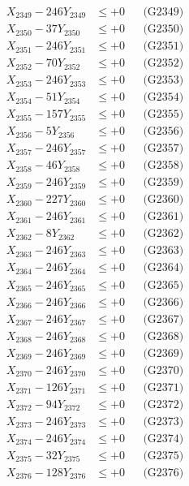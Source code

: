 \documentclass[a4paper,10pt]{article}
\begin{document}
{\begin{align}
X_{2349} - 246Y_{2349} &\leq +0 && \text{(G2349)} \\
X_{2350} - 37Y_{2350} &\leq +0 && \text{(G2350)} \\
\allowbreak
X_{2351} - 246Y_{2351} &\leq +0 && \text{(G2351)} \\
X_{2352} - 70Y_{2352} &\leq +0 && \text{(G2352)} \\
X_{2353} - 246Y_{2353} &\leq +0 && \text{(G2353)} \\
X_{2354} - 51Y_{2354} &\leq +0 && \text{(G2354)} \\
X_{2355} - 157Y_{2355} &\leq +0 && \text{(G2355)} \\
X_{2356} - 5Y_{2356} &\leq +0 && \text{(G2356)} \\
X_{2357} - 246Y_{2357} &\leq +0 && \text{(G2357)} \\
X_{2358} - 46Y_{2358} &\leq +0 && \text{(G2358)} \\
X_{2359} - 246Y_{2359} &\leq +0 && \text{(G2359)} \\
X_{2360} - 227Y_{2360} &\leq +0 && \text{(G2360)} \\
\allowbreak
X_{2361} - 246Y_{2361} &\leq +0 && \text{(G2361)} \\
X_{2362} - 8Y_{2362} &\leq +0 && \text{(G2362)} \\
X_{2363} - 246Y_{2363} &\leq +0 && \text{(G2363)} \\
X_{2364} - 246Y_{2364} &\leq +0 && \text{(G2364)} \\
X_{2365} - 246Y_{2365} &\leq +0 && \text{(G2365)} \\
X_{2366} - 246Y_{2366} &\leq +0 && \text{(G2366)} \\
X_{2367} - 246Y_{2367} &\leq +0 && \text{(G2367)} \\
X_{2368} - 246Y_{2368} &\leq +0 && \text{(G2368)} \\
X_{2369} - 246Y_{2369} &\leq +0 && \text{(G2369)} \\
X_{2370} - 246Y_{2370} &\leq +0 && \text{(G2370)} \\
\allowbreak
X_{2371} - 126Y_{2371} &\leq +0 && \text{(G2371)} \\
X_{2372} - 94Y_{2372} &\leq +0 && \text{(G2372)} \\
X_{2373} - 246Y_{2373} &\leq +0 && \text{(G2373)} \\
X_{2374} - 246Y_{2374} &\leq +0 && \text{(G2374)} \\
X_{2375} - 32Y_{2375} &\leq +0 && \text{(G2375)} \\
X_{2376} - 128Y_{2376} &\leq +0 && \text{(G2376)} \\

\end{align}}
\end{document}
